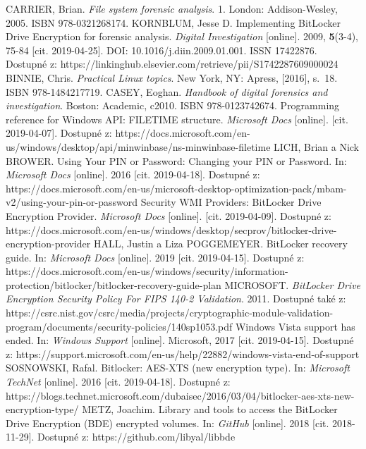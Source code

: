 \documentclass[a4paper,12pt]{article}
\begin{document}
{
CARRIER, Brian. \textit{File system forensic analysis}. 1. London: Addison-Wesley, 2005. ISBN 978-0321268174.
KORNBLUM, Jesse D. Implementing BitLocker Drive Encryption for forensic analysis. \textit{Digital Investigation} [online]. 2009, \textbf{5}(3-4), 75-84 [cit. 2019-04-25]. DOI: 10.1016/j.diin.2009.01.001. ISSN 17422876. Dostupné z: https://linkinghub.elsevier.com/retrieve/pii/S1742287609000024
BINNIE, Chris. \textit{Practical Linux topics}. New York, NY: Apress, [2016], s.~18. ISBN 978-1484217719.
CASEY, Eoghan. \textit{Handbook of digital forensics and investigation}. Boston: Academic, c2010. ISBN 978-0123742674.
Programming reference for Windows API: FILETIME structure. \textit{Microsoft Docs} [online]. [cit. 2019-04-07]. Dostupné z: https://docs.microsoft.com/en-us/windows/desktop/api/minwinbase/ns-minwinbase-filetime
LICH, Brian a Nick BROWER. Using Your PIN or Password: Changing your PIN or Password. In: \textit{Microsoft Docs} [online]. 2016 [cit. 2019-04-18]. Dostupné z: https://docs.microsoft.com/en-us/microsoft-desktop-optimization-pack/mbam-v2/using-your-pin-or-password
Security WMI Providers: BitLocker Drive Encryption Provider. \textit{Microsoft Docs} [online]. [cit. 2019-04-09]. Dostupné z: https://docs.microsoft.com/en-us/windows/desktop/secprov/bitlocker-drive-encryption-provider
HALL, Justin a Liza POGGEMEYER. BitLocker recovery guide. In: \textit{Microsoft Docs} [online]. 2019 [cit. 2019-04-15]. Dostupné z: https://docs.microsoft.com/en-us/windows/security/information-protection/bitlocker/bitlocker-recovery-guide-plan
MICROSOFT. \textit{BitLocker Drive Encryption Security Policy For FIPS 140-2 Validation}. 2011. Dostupné také z: https://csrc.nist.gov/csrc/media/projects/cryptographic-module-validation-program/documents/security-policies/140sp1053.pdf
Windows Vista support has ended. In: \textit{Windows Support} [online]. Microsoft, 2017 [cit. 2019-04-15]. Dostupné z: https://support.microsoft.com/en-us/help/22882/windows-vista-end-of-support
SOSNOWSKI, Rafal. Bitlocker: AES-XTS (new encryption type). In: \textit{Microsoft TechNet} [online]. 2016 [cit. 2019-04-18]. Dostupné z: https://blogs.technet.microsoft.com/dubaisec/2016/03/04/bitlocker-aes-xts-new-encryption-type/
METZ, Joachim. Library and tools to access the BitLocker Drive Encryption (BDE) encrypted volumes. In: \textit{GitHub} [online]. 2018 [cit. 2018-11-29]. Dostupné z: https://github.com/libyal/libbde
}
\end{document}
